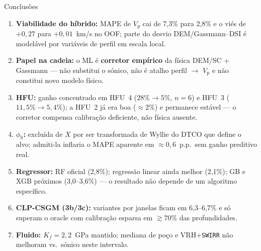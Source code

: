 \documentclass[aspectratio=169,10pt]{beamer}
\newcommand{\phiS}{\ensuremath{\phi_{\mathrm{S}}}}
\newcommand{\Vp}{\ensuremath{V_{\mathrm{p}}}}
\begin{document}
\begin{frame}{Conclusões}
  \footnotesize
  \begin{enumerate}
    \item \textbf{Viabilidade do híbrido:} MAPE de \Vp{} cai de 7,3\% para
          2,8\% e o viés de $+0{,}27$ para $+0{,}01$~km/s no OOF; parte do
          desvio DEM/Gassmann--DSI é modelável por variáveis de perfil em
          escala local.
    \item \textbf{Papel na cadeia:} o ML é \textbf{corretor empírico} da física
          DEM/SC + Gassmann --- não substitui o sónico, não é atalho perfil
          $\rightarrow$ \Vp{} e não constitui novo modelo físico.
    \item \textbf{HFU:} ganho concentrado em HFU~4 ($28\% \rightarrow 5\%$,
          $n=6$) e HFU~3 ($11{,}5\% \rightarrow 5{,}4\%$); a HFU~2 já era boa
          ($\approx 2\%$) e permanece estável --- o corretor compensa
          calibração deficiente, não física ausente.
    \item \textbf{\phiS{}:} excluída de $X$ por ser transformada de Wyllie do
          DTCO que define o alvo; admiti-la inflaria o MAPE aparente em
          $\approx 0{,}6$~p.p.\ sem ganho preditivo real.
    \item \textbf{Regressor:} RF oficial (2,8\%); regressão linear ainda melhor
          (2,1\%); GB e XGB próximos (3,0--3,6\%) --- o resultado não depende de
          um algoritmo específico.
    \item \textbf{CLP-CSGM (3b/3c):} variantes por janelas ficam em 6,3--6,7\%
          e só superam o oracle com calibração esparsa em
          $\gtrsim 70\%$ das profundidades.
    \item \textbf{Fluido:} $K_f=2{,}2$~GPa mantido; mediana de poço e
          VRH+\texttt{SWIRR} não melhoram vs.\ sónico neste intervalo.
  \end{enumerate}
\end{frame}
\end{document}
